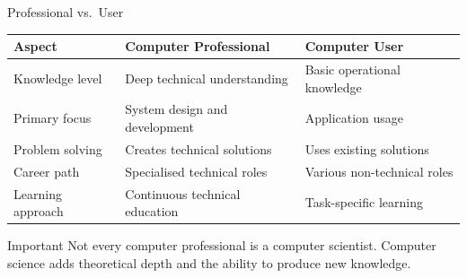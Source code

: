 \documentclass[aspectratio=169]{beamer}
\begin{document}
\begin{frame}{Professional vs.\ User}
  \small
  \begin{center}
    \begin{tabular}{@{}p{2.6cm}p{4.6cm}p{4.6cm}@{}}
      \toprule
      \textbf{Aspect} & \textbf{Computer Professional} & \textbf{Computer User}\\
      \midrule
      Knowledge level   & Deep technical understanding   & Basic operational knowledge\\
      \addlinespace
      Primary focus     & System design and development  & Application usage\\
      \addlinespace
      Problem solving   & Creates technical solutions    & Uses existing solutions\\
      \addlinespace
      Career path       & Specialised technical roles    & Various non-technical roles\\
      \addlinespace
      Learning approach & Continuous technical education & Task-specific learning\\
      \bottomrule
    \end{tabular}
  \end{center}
  \vspace{0.4cm}
  \begin{alertblock}{Important}
    Not every computer professional is a computer scientist. Computer science
    adds theoretical depth and the ability to produce new knowledge.
  \end{alertblock}
\end{frame}
\end{document}
